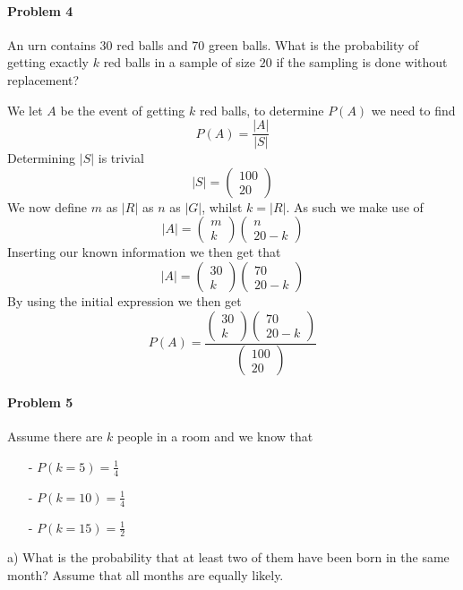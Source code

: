 \paragraph{Problem 4}
An urn contains 30 red balls and 70 green balls. What is the probability of getting exactly $k$ red balls in a sample of size $20$ if the sampling is done without replacement?

We let $A$ be the event of getting $k$ red balls, to determine $P(A)$ we need to find
\[
    P(A)=\frac{|A|}{|S|}
\]
Determining $|S|$ is trivial
\[
    |S|=\begin{pmatrix}100\\20\end{pmatrix}
\]
We now define $m$ as $|R|$ as $n$ as $|G|$, whilst $k=|R|$. As such we make use of
\[
    |A|=\begin{pmatrix}m\\k\end{pmatrix}\begin{pmatrix}n\\20-k\end{pmatrix}
\]
Inserting our known information we then get that
\[ 
    |A|=\begin{pmatrix}30\\k\end{pmatrix}\begin{pmatrix}70\\20-k\end{pmatrix}
\]
By using the initial expression we then get
\[
    P(A)=\frac{\begin{pmatrix}30\\k\end{pmatrix}\begin{pmatrix}70\\20-k\end{pmatrix}}{\begin{pmatrix}100\\20\end{pmatrix}}
\]
\paragraph{Problem 5}
Assume there are $k$ people in a room and we know that
\begin{itemize}
    \item[-] $P(k=5)=\frac{1}{4}$
    \item[-] $P(k=10)=\frac{1}{4}$
    \item[-] $P(k=15)=\frac{1}{2}$
\end{itemize}
a) What is the probability that at least two of them have been born in the same month? Assume that all months are equally likely.

